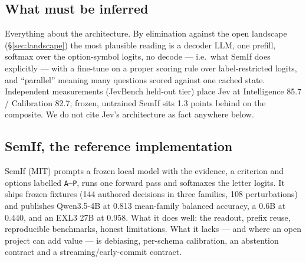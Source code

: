 \documentclass[11pt,a4paper]{article}
\newcommand{\code}[1]{\texttt{#1}}
\begin{document}
\subsection{What must be inferred}
Everything about the architecture. By elimination against the open landscape (\S\ref{sec:landscape}) the most plausible reading is a decoder LLM, one prefill, softmax over the option-symbol logits, no decode --- i.e.\ what SemIf does explicitly --- with a fine-tune on a proper scoring rule over label-restricted logits, and ``parallel'' meaning many questions scored against one cached state. Independent measurements (JevBench held-out tier) place Jev at Intelligence 85.7 / Calibration 82.7; frozen, untrained SemIf sits 1.3 points behind on the composite. We do not cite Jev's architecture as fact anywhere below.

\subsection{SemIf, the reference implementation}
SemIf (MIT) prompts a frozen local model with the evidence, a criterion and options labelled \code{A--P}, runs one forward pass and softmaxes the letter logits. It ships frozen fixtures (144 authored decisions in three families, 108 perturbations) and publishes Qwen3.5-4B at 0.813 mean-family balanced accuracy, a 0.6B at 0.440, and an EXL3 27B at 0.958. What it does well: the readout, prefix reuse, reproducible benchmarks, honest limitations. What it lacks --- and where an open project can add value --- is debiasing, per-schema calibration, an abstention contract and a streaming/early-commit contract.
\end{document}
